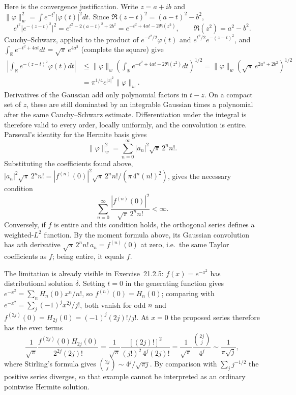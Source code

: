 Here is the convergence justification. Write $z=a+ib$ and
$\|\varphi\|_w^2=\int e^{-t^2}|\varphi(t)|^2dt$.
Since $\Re(z-t)^2=(a-t)^2-b^2$,
\[
e^{t^2}\bigl|e^{-(z-t)^2}\bigr|^2=e^{t^2-2(a-t)^2+2b^2}
=e^{-t^2+4at-2\Re(z^2)},\qquad \Re(z^2)=a^2-b^2.
\]
Cauchy--Schwarz, applied to the product of $e^{-t^2/2}\varphi(t)$ and
$e^{t^2/2}e^{-(z-t)^2}$, and
$\int_{\mathbb R}e^{-t^2+4at}dt=\sqrt\pi\,e^{4a^2}$ (complete the square)
give
\begin{align*}
\left|\int_{\mathbb R}e^{-(z-t)^2}\varphi(t)dt\right|
&\le\|\varphi\|_w
\left(\int_{\mathbb R}e^{-t^2+4at-2\Re(z^2)}dt\right)^{1/2}
=\|\varphi\|_w\left(\sqrt\pi\,e^{2a^2+2b^2}\right)^{1/2}\\
&=\pi^{1/4}e^{|z|^2}\|\varphi\|_w.
\end{align*}
Derivatives of the Gaussian add only polynomial factors in $t-z$.
On a compact set of $z$, these are still dominated by an integrable
Gaussian times a polynomial after the same Cauchy--Schwarz estimate.
Differentiation under the integral is therefore valid to every order,
locally uniformly, and the convolution is entire. Parseval's identity
for the Hermite basis gives
\[
\|\varphi\|_w^2=\sum_{n=0}^\infty |a_n|^2\sqrt\pi\,2^nn!.
\]
Substituting the coefficients found above,
$|a_n|^2\sqrt\pi\,2^nn!=|f^{(n)}(0)|^2\sqrt\pi\,2^nn!/(\pi\,4^n(n!)^2)$,
gives the necessary condition
\[
\sum_{n=0}^\infty
\frac{|f^{(n)}(0)|^2}{\sqrt\pi\,2^nn!}<\infty.
\]
Conversely, if $f$ is entire and this condition holds, the orthogonal
series defines a weighted-$L^2$ function. By the moment formula above,
its Gaussian convolution has $n$th derivative
$\sqrt\pi\,2^nn!\,a_n=f^{(n)}(0)$ at zero, i.e.\ the same Taylor
coefficients as $f$; being entire, it equals $f$.

The limitation is already visible in Exercise~21.2.5:
$f(x)=e^{-x^2}$ has distributional solution $\delta$. Setting $t=0$ in
the generating function gives $e^{-x^2}=\sum_nH_n(0)x^n/n!$, so
$f^{(n)}(0)=H_n(0)$; comparing with
$e^{-x^2}=\sum_j(-1)^jx^{2j}/j!$, both vanish for odd $n$ and
$f^{(2j)}(0)=H_{2j}(0)=(-1)^j(2j)!/j!$. At $x=0$ the proposed series
therefore has the even terms
\[
\frac1{\sqrt\pi}
\frac{f^{(2j)}(0)H_{2j}(0)}{2^{2j}(2j)!}
=\frac1{\sqrt\pi}\frac{[(2j)!]^2}{(j!)^2\,4^j(2j)!}
=\frac1{\sqrt\pi}\frac{\binom{2j}{j}}{4^j}
\sim\frac1{\pi\sqrt j},
\]
where Stirling's formula gives $\binom{2j}{j}\sim4^j/\sqrt{\pi j}$.
By comparison with $\sum_j j^{-1/2}$ the positive series diverges, so
that example cannot be interpreted as an ordinary pointwise Hermite
solution.


